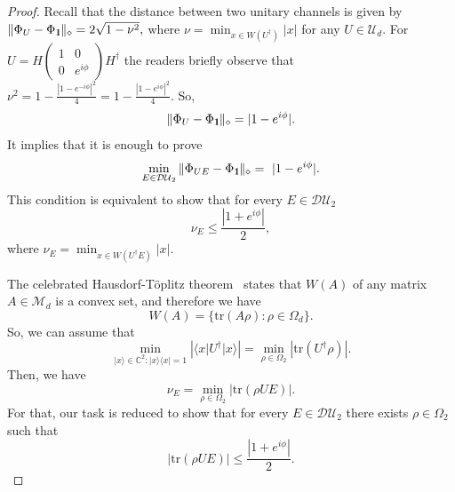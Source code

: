 \documentclass[preprint,12pt, a4paper, dvipsnames]{elsarticle}
\newcommand{\ket}[1]{\ensuremath{|#1\rangle}}
\newcommand{\bra}[1]{\ensuremath{\langle#1|}}
\newcommand{\ketbra}[2]{\ensuremath{\ket{#1}\bra{#2}}}
\newcommand{\proj}[1]{\ensuremath{\ketbra{#1}{#1}}}
\newcommand{\1}{{\rm 1\hspace{-0.9mm}l}}
\newcommand{\Id}{{\rm 1\hspace{-0.9mm}l}}
\newcommand{\diaguni}{\ensuremath{\mathcal{DU}}}
\newcommand{\tr}{\mathrm{tr}}
\theoremstyle{definition}
\begin{document}
\begin{proof} Recall that the distance between two unitary channels is given by
	$
	\| \Phi_U  - \Phi_{\1} \|_\diamond = 2 \sqrt{1-\nu^2},
	$
	where $\nu = \min_{x \in W(U^\dagger)} |x|  $ for any $U \in \mathcal{U}_d$.
	For $U = H
	\left(\begin{array}{cc}1&0\\0&e^{i \phi}\end{array}\right)  H^\dagger$ the readers briefly observe that  $\nu^2 = 1 - \frac{|1 - e^{-i \phi} |^2 }{4} = 1 - \frac{|1 - e^{i \phi} |^2 }{4}$. So,
	\begin{equation}
	\|  \Phi_U  - \Phi_{\1} \|_\diamond = | 1 - e^{i \phi} |.
	\end{equation}
	It implies that it is enough to prove  \begin{equation}
	\min_{E \in \diaguni_2} \|\Phi_{UE} -
	\Phi_\Id\|_\diamond  = | 1 - e^{i \phi} |.
	\end{equation}
	This condition is equivalent to show that for every $E \in \diaguni_2$
	\begin{equation}
	 \nu_{E} \le  \frac{|1 + e^{i \phi} | }{2},
	\end{equation}
	where $\nu_E = \min_{x \in W(U^\dagger E)} |x|. $

	The celebrated Hausdorf-T{\"o}plitz theorem~\cite{hausdorff, toeplitz} states that
	$W(A)$ of any matrix $A \in \mathcal{M}_d$ is a convex set, and therefore we have
	\begin{equation}
	W(A) = \{ \tr(A \rho): \rho \in \Omega_d\}.
	\end{equation}
	So, we can assume that
	\begin{equation}
	\min_{\ket{x} \in \mathbb{C}^2:   \proj{x} = 1} |\bra{x}U^\dagger\ket{x}| =
	\min_{\rho \in \Omega_2} |\tr(U^\dagger\rho)|.
	\end{equation}
	Then, we have
	\begin{equation}
	 \nu_{E}  =   \min_{\rho \in
		\Omega_2} \left| \tr \left( \rho U E \right) \right|.
	\end{equation}
	For that, our task is reduced to show that for every  $E \in \diaguni_2$ there exists $\rho \in \Omega_2$ such that
	\begin{equation}
 | \tr \left(\rho U E\right) | \le \frac{|1 + e^{i \phi} | }{2}.
	\end{equation}



\end{proof}
\end{document}
